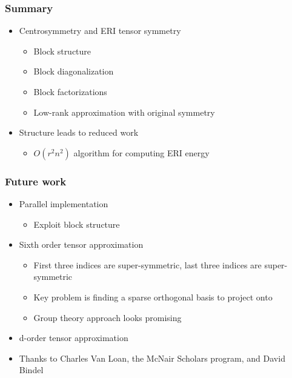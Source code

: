 \documentclass[bigger]{beamer}
\begin{document}
\begin{frame}
\frametitle{Summary}
\label{sec-1-31}
\begin{itemize}

\item Centrosymmetry and ERI tensor symmetry
\label{sec-1-31-1}%
\begin{itemize}

\item Block structure
\label{sec-1-31-1-1}%

\item Block diagonalization
\label{sec-1-31-1-2}%

\item Block factorizations
\label{sec-1-31-1-3}%

\item Low-rank approximation with original symmetry
\label{sec-1-31-1-4}%
\end{itemize} %

\item Structure leads to reduced work
\label{sec-1-31-2}%
\begin{itemize}

\item $O(r^2n^2)$ algorithm for computing ERI energy
\label{sec-1-31-2-1}%
\end{itemize} %
\end{itemize} %
\end{frame}
\begin{frame}
\frametitle{Future work}
\label{sec-1-32}
\begin{itemize}

\item Parallel implementation
\label{sec-1-32-1}%
\begin{itemize}

\item Exploit block structure
\label{sec-1-32-1-1}%
\end{itemize} %

\item Sixth order tensor approximation
\label{sec-1-32-2}%
\begin{itemize}

\item First three indices are super-symmetric, last three indices are super-symmetric
\label{sec-1-32-2-1}%

\item Key problem is finding a sparse orthogonal basis to project onto
\label{sec-1-32-2-2}%

\item Group theory approach looks promising
\label{sec-1-32-2-3}%
\end{itemize} %

\item d-order tensor approximation
\label{sec-1-32-3}%

\item Thanks to Charles Van Loan, the McNair Scholars program, and David Bindel
\label{sec-1-32-4}%
\end{itemize} %
\end{frame}
\end{document}
